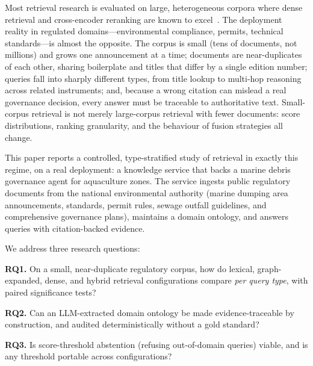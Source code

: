 \documentclass[runningheads]{llncs}
\begin{document}
Most retrieval research is evaluated on large, heterogeneous corpora where
dense retrieval and cross-encoder reranking are known to excel~\cite{beir,dpr}.
The deployment reality in regulated domains---environmental compliance,
permits, technical standards---is almost the opposite. The corpus is small
(tens of documents, not millions) and grows one announcement at a time;
documents are near-duplicates of each other, sharing boilerplate and titles
that differ by a single edition number; queries fall into sharply different
types, from title lookup to multi-hop reasoning across related instruments;
and, because a wrong citation can mislead a real governance decision, every
answer must be traceable to authoritative text. Small-corpus retrieval is not
merely large-corpus retrieval with fewer documents: score distributions,
ranking granularity, and the behaviour of fusion strategies all change.

This paper reports a controlled, type-stratified study of retrieval in exactly
this regime, on a real deployment: a knowledge service that backs a marine
debris governance agent for aquaculture zones. The service ingests public
regulatory documents from the national environmental authority (marine dumping
area announcements, standards, permit rules, sewage outfall guidelines, and
comprehensive governance plans), maintains a domain ontology, and answers
queries with citation-backed evidence.

We address three research questions:

\smallskip
\noindent\textbf{RQ1.} On a small, near-duplicate regulatory corpus, how do
lexical, graph-expanded, dense, and hybrid retrieval configurations compare
\emph{per query type}, with paired significance tests?

\smallskip
\noindent\textbf{RQ2.} Can an LLM-extracted domain ontology be made
evidence-traceable by construction, and audited deterministically without a
gold standard?

\smallskip
\noindent\textbf{RQ3.} Is score-threshold abstention (refusing
out-of-domain queries) viable, and is any threshold portable across
configurations?
\end{document}

